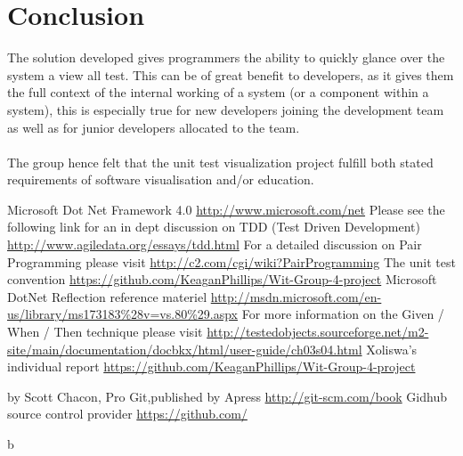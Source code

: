 \documentclass[a4paper,12pt]{article}
\begin{document}
\section{Conclusion}
The solution developed gives programmers the ability to quickly glance over the system a view all test. This can be of great benefit to developers, as it gives them the full context of the internal working of a system (or a component within a system), this is especially true for new developers joining the development team as well as for junior developers allocated to the team.\\
\\
The group hence felt that the unit test visualization project fulfill both stated requirements of software visualisation and/or education.


\begin{thebibliography}{5}
 Microsoft Dot Net Framework 4.0 \url{http://www.microsoft.com/net}
 Please see the following link for an in dept discussion on TDD (Test Driven Development) \url{http://www.agiledata.org/essays/tdd.html}
 For a detailed discussion on Pair Programming please visit \url{http://c2.com/cgi/wiki?PairProgramming}
 The unit test convention \url{https://github.com/KeaganPhillips/Wit-Group-4-project}
 Microsoft DotNet Reflection reference materiel \url{http://msdn.microsoft.com/en-us/library/ms173183%28v=vs.80%29.aspx}
 For more information on the Given / When / Then technique please visit \url{http://testedobjects.sourceforge.net/m2-site/main/documentation/docbkx/html/user-guide/ch03s04.html}
 Xoliswa's individual report \url{https://github.com/KeaganPhillips/Wit-Group-4-project}

 by Scott Chacon, Pro Git,published by Apress \url{http://git-scm.com/book}
 Gidhub source control provider \url{https://github.com/}

 b \url{}
\end{thebibliography}

 
\end{document}
